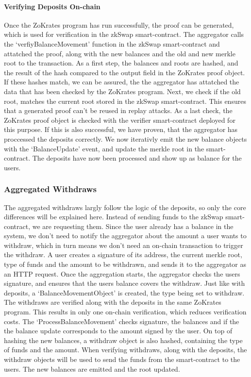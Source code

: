 \documentclass[../../thesis.tex]{subfiles}
\begin{document}
\paragraph{Verifying Deposits On-chain}
Once the ZoKrates program has run successfully, the proof can be generated, which is used for verification in the zkSwap smart-contract. The aggregator calls the `verfiyBalanceMovement' function in the zkSwap smart-contract and attatched the proof, along with the new balances and the old and new merkle root to the transaction. As a first step, the balances and roots are hashed, and the result of the hash compared to the output field in the ZoKrates proof object. If these hashes match, we can be assured, the the aggregator has attatched the data that has been checked by the ZoKrates program. Next, we check if the old root, matches the current root stored in the zkSwap smart-contract. This ensures that a generated proof can't be reused in replay attacks. As a last check, the ZoKrates proof object is checked with the verifier smart-contract deployed for this purpose. If this is also successful, we have proven, that the aggregator has proccessed the deposits correctly. We now iterativly emit the new balance objects with the `BalanceUpdate' event, and update the merkle root in the smart-contract. The deposits have now been processed and show up as balance for the users. 

\subsubsection{Aggregated Withdraws} \label{with}
The aggregated withdraws largly follow the logic of the deposits, so only the core differences will be explained here. Instead of sending funds to the zkSwap smart-contract, we are requesting them. Since the user already has a balance in the system, we don't need to notify the aggregator about the amount a user wants to withdraw, which in turn means we don't need an on-chain transaction to trigger the withdraw. A user creates a signature of its address, the current merkle root, type of funds and the amount to be withdrawn, and sends it to the aggregator as an HTTP request. Once the aggregation starts, the aggregator checks the users signature, and ensures that the users balance covers the withdraw. Just like with deposits, a `BalanceMovementObject' is created, the type being set to withdraw. The withdraws are verified along with the deposits in the same ZoKrates program. This results in only one on-chain verification, which reduces verification costs. The `ProcessBalanceMovement' checks signature, the balances and if the the balance update corresponds to the amount signed by the user. On top of hashing the new balances, a withdraw object is also hashed, containing the type of funds and the amount. When verifying withdraws, along with the deposits, the withdraw objects will be used to send the funds from the smart-contract to the users. The new balances are emitted and the root updated. 
\end{document}
